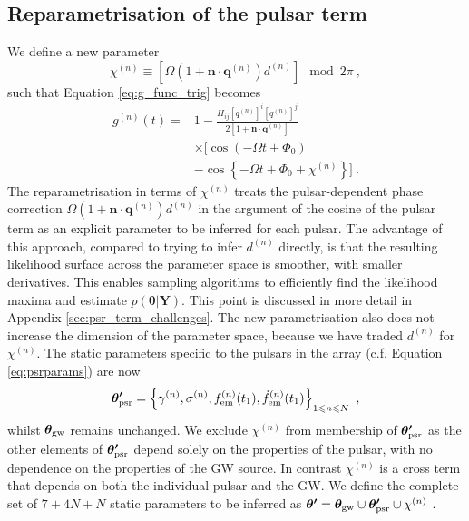 \documentclass[fleqn,usenatbib,useAMS]{mnras}
\begin{document}
\subsection{Reparametrisation of the pulsar term} \label{sec:pulsar_term2}
We define a new parameter 
\begin{equation}
	\chi^{(n)} \equiv \left[ \Omega \left( 1 + \boldsymbol{n}\cdot \boldsymbol{q}^{(n)} \right)  d^{(n)} \right ] \mod 2 \pi \ ,
\end{equation}
such that Equation \eqref{eq:g_func_trig} becomes
\begin{align}
	g^{(n)}(t) =& 1 - \frac{ H_{ij}[q^{(n)}]^i [q^{(n)}]^j }{2 [1 + \boldsymbol{n}\cdot \boldsymbol{q}^{(n)}] } \nonumber \\
	& \times \Big[\cos\left(-\Omega t +\Phi_0\right) \nonumber \\
	&- \cos \left \{-\Omega t +\Phi_0 + \chi^{(n)} \right \} \Big ] \ .
	\label{eq:g_func_trig_chi}
\end{align}
The reparametrisation in terms of $\chi^{(n)}$ treats the pulsar-dependent phase correction $\Omega \left( 1 + \boldsymbol{n}\cdot \boldsymbol{q}^{(n)} \right)  d^{(n)}$ in the argument of the cosine of the pulsar term as an explicit parameter to be inferred for each pulsar. The advantage of this approach, compared to trying to infer $d^{(n)}$ directly, is that the resulting likelihood surface across the parameter space is smoother, with smaller derivatives. This enables sampling algorithms to efficiently find the likelihood maxima and estimate $p(\boldsymbol{\theta} | \boldsymbol{Y})$. This point is discussed in more detail in Appendix \ref{sec:psr_term_challenges}. The new parametrisation also does not increase the dimension of the parameter space, because we have traded $d^{(n)}$ for $\chi^{(n)}$. The static parameters specific to the pulsars in the array (c.f. Equation \eqref{eq:psrparams}) are now
\begin{equation}
	\boldsymbol{\theta'}_{\rm psr} = \left \{ \gamma^{(n)},\sigma^{(n)}, f_{\rm em}^{(n)}(t_1),\dot{f}_{\rm em}^{(n)}(t_1) \right\}_{1\leq n \leq N} \ ,  \label{eq:psrparamsnew}
\end{equation}
whilst $\boldsymbol{\theta}_{\rm gw}$  remains unchanged. We exclude $\chi^{(n)}$ from membership of $\boldsymbol{\theta'}_{\rm psr}$ as the other elements of $\boldsymbol{\theta'}_{\rm psr}$ depend solely on the properties of the pulsar, with no dependence on the properties of the GW source. In contrast $\chi^{(n)}$ is a cross term that depends on both the individual pulsar and the GW. We define the complete set of $7 +4N + N$ static parameters to be inferred as $\boldsymbol{\theta'} = \boldsymbol{\theta}_{\rm gw} \cup \boldsymbol{\theta'}_{\rm psr} \cup \chi^{(n)}$ . \newline 
\end{document}

